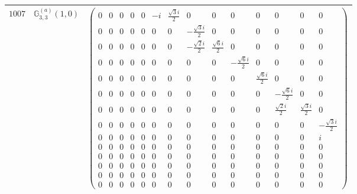 \documentclass[fleqn,8pt,landscape]{jsarticle}
\begin{document}
\begin{center}
\begin{longtable}{ccc}
$ 1007 $ & $ \mathbb{G}_{3,3}^{(a)}(1,0) $ & $ \begin{pmatrix} 0 & 0 & 0 & 0 & 0 & - i & \frac{\sqrt{3} i}{2} & 0 & 0 & 0 & 0 & 0 & 0 & 0 \\ 0 & 0 & 0 & 0 & 0 & 0 & 0 & - \frac{\sqrt{3} i}{2} & 0 & 0 & 0 & 0 & 0 & 0 \\ 0 & 0 & 0 & 0 & 0 & 0 & 0 & - \frac{\sqrt{2} i}{2} & \frac{\sqrt{6} i}{2} & 0 & 0 & 0 & 0 & 0 \\ 0 & 0 & 0 & 0 & 0 & 0 & 0 & 0 & 0 & - \frac{\sqrt{6} i}{2} & 0 & 0 & 0 & 0 \\ 0 & 0 & 0 & 0 & 0 & 0 & 0 & 0 & 0 & 0 & \frac{\sqrt{6} i}{2} & 0 & 0 & 0 \\ 0 & 0 & 0 & 0 & 0 & 0 & 0 & 0 & 0 & 0 & 0 & - \frac{\sqrt{6} i}{2} & 0 & 0 \\ 0 & 0 & 0 & 0 & 0 & 0 & 0 & 0 & 0 & 0 & 0 & \frac{\sqrt{2} i}{2} & \frac{\sqrt{3} i}{2} & 0 \\ 0 & 0 & 0 & 0 & 0 & 0 & 0 & 0 & 0 & 0 & 0 & 0 & 0 & - \frac{\sqrt{3} i}{2} \\ 0 & 0 & 0 & 0 & 0 & 0 & 0 & 0 & 0 & 0 & 0 & 0 & 0 & i \\ 0 & 0 & 0 & 0 & 0 & 0 & 0 & 0 & 0 & 0 & 0 & 0 & 0 & 0 \\ 0 & 0 & 0 & 0 & 0 & 0 & 0 & 0 & 0 & 0 & 0 & 0 & 0 & 0 \\ 0 & 0 & 0 & 0 & 0 & 0 & 0 & 0 & 0 & 0 & 0 & 0 & 0 & 0 \\ 0 & 0 & 0 & 0 & 0 & 0 & 0 & 0 & 0 & 0 & 0 & 0 & 0 & 0 \\ 0 & 0 & 0 & 0 & 0 & 0 & 0 & 0 & 0 & 0 & 0 & 0 & 0 & 0 \end{pmatrix} $ \\ \hline

\end{longtable}
\end{center}
\end{document}
